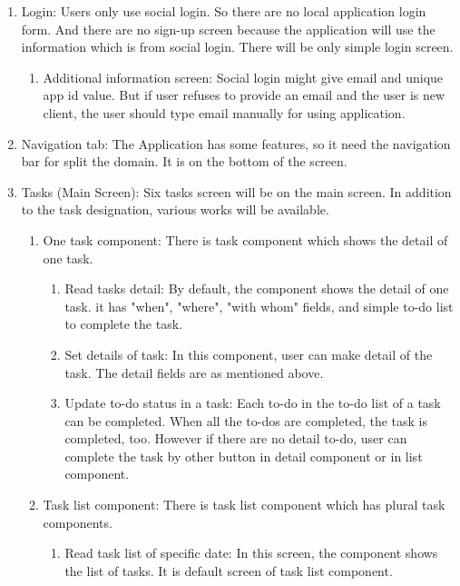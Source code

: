 \documentclass[conference]{IEEEtran}
\begin{document}
\begin{enumerate}
    \item Login: Users only use social login. So there are no local application login form. And there are no sign-up screen because the application will use the information which is from social login. There will be only simple login screen.
    \begin{enumerate}
        \item Additional information screen: Social login might give email and unique app id value. But if user refuses to provide an email and the user is new client, the user should type email manually for using application.\\
    \end{enumerate}
    \item Navigation tab: The Application has some features, so it need the navigation bar for split the domain. It is on the bottom of the screen.\\
    \item Tasks (Main Screen): Six tasks screen will be on the main screen. In addition to the task designation, various works will be available.
    \begin{enumerate}
        \item One task component: There is task component which shows the detail of one task.
        \begin{enumerate}
            \item Read tasks detail: By default, the component shows the detail of one task. it has "when", "where", "with whom" fields, and simple to-do list to complete the task.
            \item Set details of task: In this component, user can make detail of the task. The detail fields are as mentioned above.
            \item Update to-do status in a task: Each to-do in the to-do list of a task can be completed. When all the to-dos are completed, the task is completed, too. However if there are no detail to-do, user can complete the task by other button in detail component or in list component. \\
        \end{enumerate}
        \item Task list component: There is task list component which has plural task components.
        \begin{enumerate}
            \item Read task list of specific date: In this screen, the component shows the list of tasks. It is default screen of task list component.

\end{enumerate}
\end{enumerate}
\end{enumerate}
\end{document}
